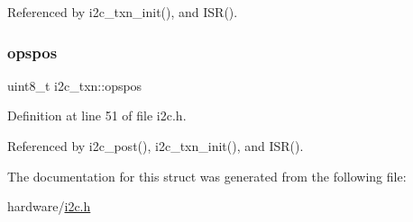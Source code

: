 Referenced by i2c\+\_\+txn\+\_\+init(), and I\+S\+R().

\mbox{\label{structi2c__txn_ac69407fdd93fd5d96075b8ebf77ecbca}} 
\subsubsection{\texorpdfstring{opspos}{opspos}}
{\footnotesize\ttfamily uint8\+\_\+t i2c\+\_\+txn\+::opspos}



Definition at line 51 of file i2c.\+h.



Referenced by i2c\+\_\+post(), i2c\+\_\+txn\+\_\+init(), and I\+S\+R().



The documentation for this struct was generated from the following file\+:\begin{DoxyCompactItemize}
\item 
hardware/\hyperlink{i2c_8h}{i2c.\+h}\end{DoxyCompactItemize}
